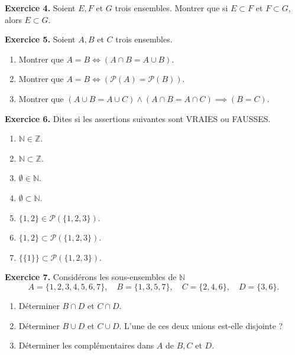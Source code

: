 \documentclass[a4paper, 10pt]{report}
\begin{document}
	\vspace{5mm}
	\noindent
	\textbf{Exercice 4.} Soient $E, F$ et $G$ trois ensembles. Montrer
	que	si $E \subset F$ et $F \subset G$, alors $E \subset G$.
	
	\vspace{5mm}
	\noindent
	\textbf{Exercice 5.} Soient $A, B$ et $C$ trois ensembles.
	\begin{enumerate}[label=(\roman*)]
		\item Montrer que $A = B \iff (A \cap B = A \cup B)$.
		\item Montrer que $A = B \iff
			(\mathcal{P}(A) = \mathcal{P}(B))$.
		\item Montrer que $(A \cup B = A \cup C) \land
			(A \cap B = A \cap C) \implies (B = C)$.
	\end{enumerate}
	
	\vspace{5mm}
	\noindent
	\textbf{Exercice 6.} Dites si les assertions suivantes sont
	VRAIES ou FAUSSES.
	\begin{enumerate}[label=(\roman*)]
		\item $\mathbb{N} \in \mathbb{Z}$.
		\item $\mathbb{N} \subset \mathbb{Z}$.
		\item $\emptyset \in \mathbb{N}$.
		\item $\emptyset \subset \mathbb{N}$.
		\item $\{1,2\} \in \mathcal{P}(\{1,2,3\})$.
		\item $\{1,2\} \subset \mathcal{P}(\{1,2,3\})$.
		\item $\{\{1\}\} \subset \mathcal{P}(\{1,2,3\})$.
	\end{enumerate}
	
	\vspace{5mm}
	\noindent
	\textbf{Exercice 7.} Considérons les sous-ensembles de $\mathbb{N}$
	\[
		A = \{1,2,3,4,5,6,7\}, \quad B = \{1,3,5,7\}, \quad
			C = \{2,4,6\}, \quad D = \{3,6\}.
	\]
	\begin{enumerate}[label=(\roman*)]
		\item Déterminer $B \cap D$ et $C \cap D$.
		\item Déterminer $B \cup D$ et $C \cup D$. L'une de
		ces deux unions est-elle disjointe ?
		\item Déterminer les complémentaires dans $A$ de $B, C$ et $D$.
	\end{enumerate}
	
\end{document}
